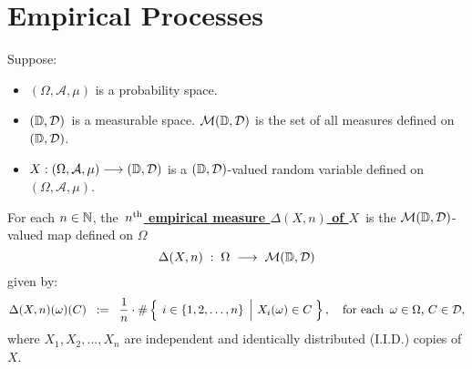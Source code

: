 

\section{Empirical Processes}
\setcounter{theorem}{0}
\setcounter{equation}{0}


\renewcommand{\theenumi}{\roman{enumi}}
\renewcommand{\labelenumi}{\textnormal{(\theenumi)}$\;\;$}


\begin{definition}
\mbox{}\vskip 0.1cm
\noindent
Suppose:
\begin{itemize}
\item
	$(\Omega,\mathcal{A},\mu)$ is a probability space.
\item
	$(\mathbb{D},\mathcal{D})$\, is a measurable space.
	$\mathcal{M}(\mathbb{D},\mathcal{D})$ is the set of all measures defined on $(\mathbb{D},\mathcal{D})$.
\item
	$X : (\Omega,\mathcal{A},\mu) \longrightarrow (\mathbb{D},\mathcal{D})$
	is a $(\mathbb{D},\mathcal{D})$-valued random variable defined on
	$(\Omega,\mathcal{A},\mu)$.
\end{itemize}
For each $n\in\mathbb{N}$, the
\,\underline{\textbf{$n^{\textnormal{th}}$ empirical measure $\Delta(X,n)$ of $X$}}\,
is the $\mathcal{M}(\mathbb{D},\mathcal{D})$-valued map defined on $\Omega$
\begin{equation*}
\Delta(X,n) \; : \; \Omega \;\longrightarrow\; \mathcal{M}(\mathbb{D},\mathcal{D})
\end{equation*}
given by:
\begin{equation*}
\Delta(X,n)(\omega)(C)
\;\; := \;\;
	\dfrac{1}{n} \cdot
	\#\left\{\;
	\left.
		i \overset{{\color{white}.}}{\in} \{1,2,\ldots,n\}
	\;\,\right\vert\,
		X_{i}(\omega) \in C
	\;\right\},
	\quad
	\textnormal{for each \,$\omega\in\Omega$, $C \in \mathcal{D}$},
\end{equation*}
where $X_{1}, X_{2}, \ldots, X_{n}$ are independent and identically distributed (I.I.D.) copies of $X$.
\end{definition}


